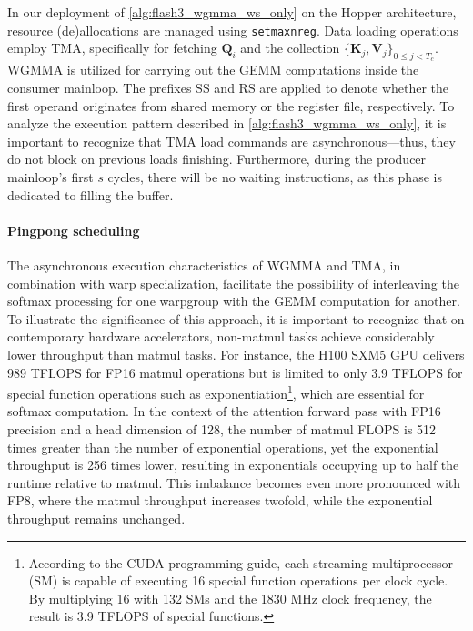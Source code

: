 In our deployment of \cref{alg:flash3_wgmma_ws_only} on the Hopper architecture, resource (de)allocations are managed using \verb|setmaxnreg|. Data loading operations employ TMA, specifically for fetching $\mathbf{Q}_i$ and the collection $\{ \mathbf{K}_j, \mathbf{V}_j \}_{0 \leq j < T_c}$. WGMMA is utilized for carrying out the GEMM computations inside the consumer mainloop. The prefixes SS and RS are applied to denote whether the first operand originates from shared memory or the register file, respectively. To analyze the execution pattern described in \cref{alg:flash3_wgmma_ws_only}, it is important to recognize that TMA load commands are asynchronous—thus, they do not block on previous loads finishing. Furthermore, during the producer mainloop’s first $s$ cycles, there will be no waiting instructions, as this phase is dedicated to filling the buffer.

\paragraph{Pingpong scheduling} The asynchronous execution characteristics of WGMMA and TMA, in combination with warp specialization, facilitate the possibility of interleaving the softmax processing for one warpgroup with the GEMM computation for another. To illustrate the significance of this approach, it is important to recognize that on contemporary hardware accelerators, non-matmul tasks achieve considerably lower throughput than matmul tasks. For instance, the H100 SXM5 GPU delivers 989 TFLOPS for FP16 matmul operations but is limited to only 3.9 TFLOPS for special function operations such as exponentiation\footnote{According to the CUDA programming guide, each streaming multiprocessor (SM) is capable of executing 16 special function operations per clock cycle. By multiplying 16 with 132 SMs and the 1830 MHz clock frequency, the result is 3.9 TFLOPS of special functions.}, which are essential for softmax computation. In the context of the attention forward pass with FP16 precision and a head dimension of 128, the number of matmul FLOPS is 512 times greater than the number of exponential operations, yet the exponential throughput is 256 times lower, resulting in exponentials occupying up to half the runtime relative to matmul. This imbalance becomes even more pronounced with FP8, where the matmul throughput increases twofold, while the exponential throughput remains unchanged.

